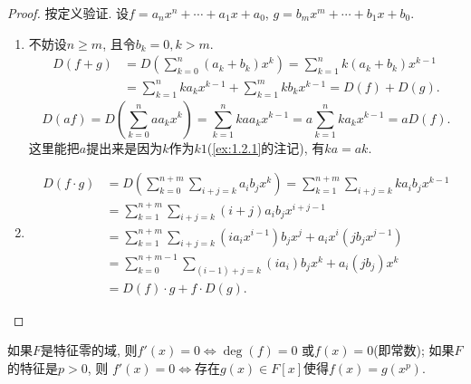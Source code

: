 \begin{proof}
    按定义验证. 设$f = a_nx^n + \cdots + a_1x + a_0$, $g = b_mx^m + \cdots + b_1x + b_0$.
    \begin{enumerate}[(1)]
        \item 不妨设$n \geqslant m$, 且令$b_k = 0, k > m$.
        \[
        \begin{aligned}
            D(f + g) &= D\left(\sum_{k = 0}^{n} (a_k + b_k)x^k\right) = \sum_{k = 1}^{n} k(a_k + b_k)x^{k - 1}\\ 
            &= \sum_{k = 1}^{n} ka_kx^{k - 1} + \sum_{k = 1}^{m} kb_kx^{k - 1} = D(f) + D(g).
        \end{aligned}
        \]
        \[
            D(af) = D\left(\sum_{k = 0}^{n} aa_kx^k\right) = \sum_{k = 1}^{n} kaa_kx^{k - 1} = a\sum_{k = 1}^{n} ka_kx^{k - 1} = aD(f).
        \]
        这里能把$a$提出来是因为$k$作为$k1$(\ref{ex:1.2.1}的注记), 有$ka = ak$.
        \item \[
            \begin{aligned}
                D(f \cdot g) &= D\left(\sum_{k = 0}^{n + m} \sum_{i + j = k} a_ib_jx^k\right) = \sum_{k = 1}^{n + m} \sum_{i + j = k} ka_ib_jx^{k - 1}\\
                &= \sum_{k = 1}^{n + m} \sum_{i + j = k} (i + j)a_ib_jx^{i + j - 1}\\
                &= \sum_{k = 1}^{n + m} \sum_{i + j = k} (ia_ix^{i - 1})b_jx^j + a_ix^i(jb_jx^{j - 1})\\
                &= \sum_{k = 0}^{n + m - 1} \sum_{(i - 1) + j = k} (ia_i)b_jx^{k} + a_i(jb_j)x^k\\
                &= D(f) \cdot g + f \cdot D(g).
            \end{aligned}
        \]
    \end{enumerate}
\end{proof}

\begin{problem}
    如果$F$是特征零的域, 则$f'(x) = 0 \Leftrightarrow \deg(f) = 0$
或$f(x) = 0$(即常数); 如果$F$的特征是$p > 0$, 则
$f'(x) = 0 \Leftrightarrow$存在$g(x) \in F[x]$使得$f(x) = g(x^p)$.
\end{problem}

